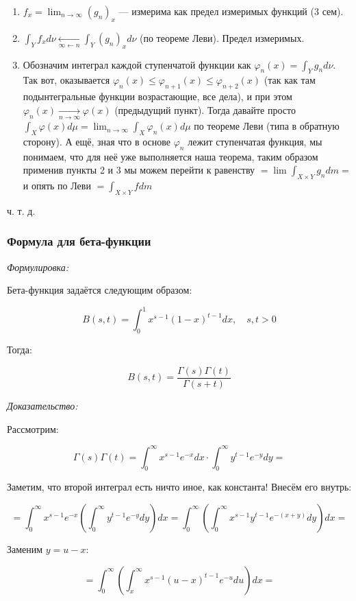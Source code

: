 \documentclass{article}
\def\goesto#1{\underset{#1}{\longrightarrow}}
\def\toinf#1{\goesto{#1 \rightarrow \infty}}
\def\ntoinf{\toinf{n}}
\begin{document}
\begin{enumerate}
    \item $f_x = \lim_{n \rightarrow \infty} (g_n)_x$ --- измерима как предел измеримых функций (3 сем).
    \item $\int_{Y} f_x d\nu \underset{\infty \leftarrow n}{\longleftarrow} \int_{Y} (g_n)_x d\nu$ (по теореме Леви). Предел измеримых.
    \item Обозначим интеграл каждой ступенчатой функции как $\varphi_n(x) = \int_{Y} g_n d\nu$. Так вот, оказывается $\varphi_n(x) \le \varphi_{n + 1}(x) \le \varphi_{n + 2}(x)$ (так как там подынтегральные функции возрастающие, все дела), и при этом $\varphi_n(x) \ntoinf \varphi(x)$ (предыдущий пункт). Тогда давайте просто $\int_{X} \varphi(x) d\mu = \lim_{n \rightarrow \infty} \int_{X} \varphi_n(x) d\mu$ по теореме Леви (типа в обратную сторону). А ещё, зная что в основе $\varphi_n$ лежит ступенчатая функция, мы понимаем, что для неё уже выполняется наша теорема, таким образом применив пункты 2 и 3 мы можем перейти к равенству $= \lim \int_{X \times Y} g_n dm = $ и опять по Леви $ = \int_{X \times Y} fdm$
\end{enumerate}

ч. т. д. 

\subsubsection{Формула для бета-функции}
\textit{Формулировка:}

Бета-функция задаётся следующим образом: 

\[B(s, t) = \int_{0}^{1}x^{s - 1}(1 - x)^{t - 1}dx, \quad s, t > 0\]

Тогда:

\[B(s, t) = \frac{\Gamma(s)\Gamma(t)}{\Gamma(s + t)}\]

\textit{Доказательство:}

Рассмотрим:

\[\Gamma(s)\Gamma(t) = \int_{0}^{\infty}x^{s - 1}e^{-x}dx \cdot \int_{0}^{\infty} y^{t - 1}e^{-y} dy = \]

Заметим, что второй интеграл есть ничто иное, как константа! Внесём его внутрь:

\[= \int_{0}^{\infty} x^{s - 1}e^{-x} \left(\int_{0}^{\infty} y^{t - 1}e^{-y}dy\right)dx = \int_{0}^{\infty}  \left(\int_{0}^{\infty} x^{s - 1} y^{t - 1}e^{-(x + y)}dy\right)dx = \]

Заменим $y = u - x$:

\[= \int_{0}^{\infty} \left(\int_{x}^{\infty}x^{s - 1}(u - x)^{t - 1}e^{-u}du\right)dx = \]
\end{document}
